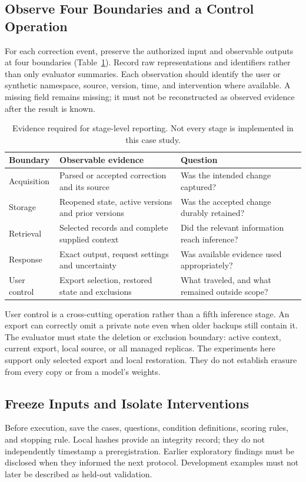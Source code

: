 \documentclass[runningheads]{llncs}
\begin{document}
\subsection{Observe Four Boundaries and a Control Operation}
For each correction event, preserve the authorized input and observable outputs at four boundaries (Table~\ref{tab:stages}). Record raw representations and identifiers rather than only evaluator summaries. Each observation should identify the user or synthetic namespace, source, version, time, and intervention where available. A missing field remains missing; it must not be reconstructed as observed evidence after the result is known.

\begin{table}[t]
\caption{Evidence required for stage-level reporting. Not every stage is implemented in this case study.}\label{tab:stages}
\small
\begin{tabular}{p{2.1cm}p{5.5cm}p{3.8cm}}
\toprule
Boundary & Observable evidence & Question \\
\midrule
Acquisition & Parsed or accepted correction and its source & Was the intended change captured? \\
Storage & Reopened state, active versions and prior versions & Was the accepted change durably retained? \\
Retrieval & Selected records and complete supplied context & Did the relevant information reach inference? \\
Response & Exact output, request settings and uncertainty & Was available evidence used appropriately? \\
User control & Export selection, restored state and exclusions & What traveled, and what remained outside scope? \\
\bottomrule
\end{tabular}
\end{table}

User control is a cross-cutting operation rather than a fifth inference stage. An export can correctly omit a private note even when older backups still contain it. The evaluator must state the deletion or exclusion boundary: active context, current export, local source, or all managed replicas. The experiments here support only selected export and local restoration. They do not establish erasure from every copy or from a model's weights.

\subsection{Freeze Inputs and Isolate Interventions}
Before execution, save the cases, questions, condition definitions, scoring rules, and stopping rule. Local hashes provide an integrity record; they do not independently timestamp a preregistration. Earlier exploratory findings must be disclosed when they informed the next protocol. Development examples must not later be described as held-out validation.
\end{document}
